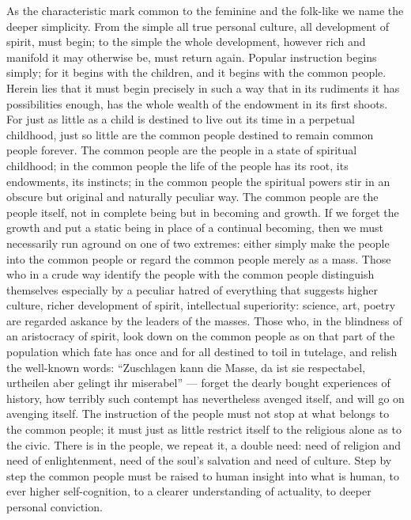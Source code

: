 \documentclass[12pt]{book}
\newcommand{\opage}[1]{\marginnote{\footnotesize\textit{[#1]}}}
\begin{document}
As the characteristic mark common to the feminine and the folk-like we
name the deeper simplicity. From the simple all true personal culture, all
development of spirit, must begin; to the simple the whole development,
however rich and manifold it may otherwise be, must return again. Popular
instruction begins simply; for it begins with the children, and it begins
with the common people. Herein lies that it must begin precisely in such a
way that in its rudiments it has possibilities enough, has the whole
wealth of the endowment in its first shoots. For just as little as a child
is destined to live out its time in a perpetual childhood, just so little
are the common people destined to remain common people forever. The common
people are the people in a state of spiritual childhood; in the common
people the life of the people has its root, its endowments, its instincts;
in the common people the spiritual powers stir in an obscure but original
and naturally peculiar way. The common people are the people itself, not
in complete being but in becoming and growth. If we forget the growth and
put a static being in place of a continual becoming, then we must
necessarily run aground on one of two extremes: either simply make the
people into the common people or regard the common people merely as a
mass. Those who in a crude way identify the people with the common people
\opage{287}\setcounter{footnote}{0}%
distinguish themselves especially by a peculiar hatred of everything that
suggests higher culture, richer development of spirit, intellectual
superiority: science, art, poetry are regarded askance by the leaders of
the masses. Those who, in the blindness of an aristocracy of spirit, look
down on the common people as on that part of the population which fate
has once and for all destined to toil in tutelage, and relish the
well-known words: ``Zuschlagen kann die Masse, da ist sie respectabel,
urtheilen aber gelingt ihr miserabel'' --- forget the dearly bought
experiences of history, how terribly such contempt has nevertheless
avenged itself, and will go on avenging itself. The instruction of the
people must not stop at what belongs to the common people; it must just as
little restrict itself to the religious alone as to the civic. There is in
the people, we repeat it, a double need: need of religion and need of
enlightenment, need of the soul's salvation and need of culture. Step by
step the common people must be raised to human insight into what is
human, to ever higher self-cognition, to a clearer understanding of
actuality, to deeper personal conviction.
\end{document}

